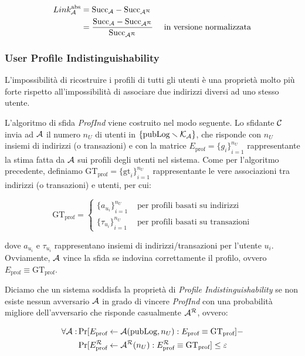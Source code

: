 \[ \begin{aligned} Link^{\text{abs}}_{\mathcal{A}} &= \text{Succ}_{\mathcal{A}} - \text{Succ}_{\mathcal{A}^\mathcal{R}} \\
   &= \frac{\text{Succ}_{\mathcal{A}} - \text{Succ}_{\mathcal{A}^\mathcal{R}}}{\text{Succ}_{\mathcal{A}^\mathcal{R}}} \quad \text{ in versione normalizzata}
   \end{aligned}\]

\subsubsection{User Profile Indistinguishability}\label{profile-indistinguishability}

L'impossibilità di ricostruire i profili di tutti gli utenti è una proprietà molto più forte rispetto all'impossibilità di associare due indirizzi diversi ad uno stesso utente.

L'algoritmo di sfida \emph{ProfInd}\label{profind_alg} viene costruito nel modo seguente.
Lo sfidante $\mathcal{C}$ invia ad $\mathcal{A}$ il numero $n_U$ di utenti in $\{\text{pubLog} \smallsetminus \mathcal{K}_\mathcal{A}\}$, che risponde con $n_U$ insiemi di indirizzi (o transazioni) e con la matrice $E_\text{prof} = {\{g_i\}}^{n_U}_{i=1}$ rappresentante la stima fatta da $\mathcal{A}$ sui profili degli utenti nel sistema.
Come per l'algoritmo precedente, definiamo $\text{GT}_\text{prof} = {\{\text{gt}_i\}}^{n_U}_{i=1}$ rappresentante le vere associazioni tra indirizzi (o transazioni) e utenti, per cui:

\[
	\text{GT}_\text{prof} = \begin{cases}
		{\{a_{u_i}\}}^{n_U}_{i=1} &\text{ per profili basati su indirizzi} \\
		{\{\tau_{u_i}\}}^{n_U}_{i=1} &\text{ per profili basati su transazioni}
	\end{cases}
\]

dove $a_{u_i}$ e $\tau_{u_i}$ rappresentano insiemi di indirizzi/transazioni per l'utente $u_i$.
Ovviamente, $\mathcal{A}$ vince la sfida se indovina correttamente il profilo, ovvero $E_\text{prof} \equiv \text{GT}_\text{prof}$.



Diciamo che un sistema soddisfa la proprietà di \emph{Profile Indistinguishability} se non esiste nessun avversario $\mathcal{A}$ in grado di vincere \emph{ProfInd} con una probabilità migliore dell'avversario che risponde casualmente $\mathcal{A}^\mathcal{R}$, ovvero:

\[
	\begin{aligned}
		\forall \mathcal{A}: &\Pr [E_\text{prof} \leftarrow \mathcal{A}(\text{pubLog}, n_U): E_\text{prof} \equiv \text{GT}_\text{prof}] - \\
		&\Pr [ E^\mathcal{R}_\text{prof} \leftarrow \mathcal{A}^\mathcal{R}(n_U) : E^\mathcal{R}_\text{prof} \equiv \text{GT}_\text{prof} ] \leq \varepsilon
	\end{aligned}
\]

